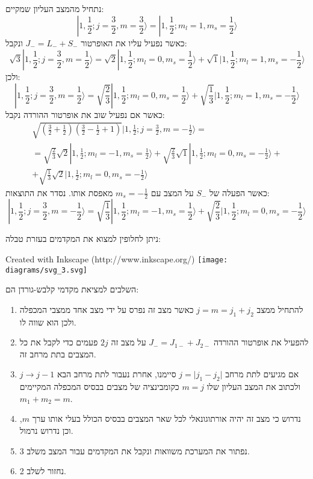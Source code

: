 \documentclass{tstextbook}
\begin{document}
\begin{example}[חיבור תנ"ז \(s=\frac{1}{2}\) עם \(l=1\)]
נתחיל מהמצב העליון שמקיים:
$$|1,{\frac{1}{2}};j={\frac{3}{2}},m={\frac{3}{2}}\rangle=|1,{\frac{1}{2}};m_{l}=1,m_{s}={\frac{1}{2}}\rangle$$
כאשר נפעיל עליו את האופרטור \(J_{-}=L_{-}+S_{-}\) ונקבל:
$$\sqrt{3}|1,\frac{1}{2};j=\frac{3}{2},m=\frac{1}{2}\rangle=\sqrt{2}|1,\frac{1}{2};m_{l}=0,m_{s}=\frac{1}{2}\rangle+\sqrt{1}|1,\frac{1}{2};m_{l}=1,m_{s}=-\frac{1}{2}\rangle$$
ולכן:
$$|1,{\frac{1}{2}};j={\frac{3}{2}},m={\frac{1}{2}}\rangle={\sqrt{\frac{2}{3}}}|1,{\frac{1}{2}};m_{l}=0,m_{s}={\frac{1}{2}}\rangle+{\sqrt{\frac{1}{3}}}|1,{\frac{1}{2}};m_{l}=1,m_{s}=-{\frac{1}{2}}\rangle$$
כאשר אם נפעיל שוב את אופרטור ההורדה נקבל:
\begin{gather*}{\sqrt{\left({\frac{3}{2}}+{\frac{1}{2}}\right)\left({\frac{3}{2}}-{\frac{1}{2}}+1\right)}}|1,{\frac{1}{2}};j={\frac{3}{2}},m=-{\frac{1}{2}}\rangle=\\ =\sqrt{\frac{2}{3}}\sqrt{2}|1,\frac{1}{2};m_{l}=-1,m_{s}=\frac{1}{2}\rangle+\sqrt{\frac{2}{3}}\sqrt{1}|1,\frac{1}{2};m_{l}=0,m_{s}=-\frac{1}{2}\rangle+ \\+\sqrt{\frac{1}{3}}\sqrt{2}|1,\frac{1}{2};m_{l}=0,m_{s}=-\frac{1}{2}\rangle 
\end{gather*}
כאשר הפעלה של \(S_{-}\) על המצב עם \(m_{s}=-\frac{1}{2}\) מאפסת אותו. נסדר את התוצאות:
$$|1,{\frac{1}{2}};j={\frac{3}{2}},m=-{\frac{1}{2}}\rangle={\sqrt{\frac{1}{3}}}|1,{\frac{1}{2}};m_{l}=-1,m_{s}={\frac{1}{2}}\rangle+{\sqrt{\frac{2}{3}}}|1,{\frac{1}{2}};m_{l}=0,m_{s}=-{\frac{1}{2}}\rangle$$

\end{example}
ניתן לחלופין למצוא את המקדמים בעזרת טבלה:

 Created with Inkscape (http://www.inkscape.org/) \texttt{[image: diagrams/svg\_3.svg]}
\begin{summary}
השלבים למציאת מקדמי קלבש-גורדן הם:

  \begin{enumerate}
    \item להתחיל ממצב \(j=m=j_{1}+j_{2}\) כאשר מצב זה נפרס על ידי מצב אחד ממצבי המכפלה ולכן הוא שווה לו. 


    \item להפעיל את אופרטור ההורדה \(J_{-}=J_{1-}+J_{2-}\) על מצב זה \(2j\) פעמים כדי לקבל את כל המצבים בתת מרחב זה. 


    \item אם מגיעים לתת מרחב \(j=\lvert j_{1}-j_{2} \rvert\) סיימנו, אחרת נעבור לתת מרחב הבא \(j\to j-1\) ולכתוב את המצב העליון שלו \(m=j\) כקומבינציה של מצבים בבסיס המכפלה המקיימים \(m_{1}+m_{2}=m\). 


    \item נדרוש כי מצב זה יהיה אורתוגונאלי לכל שאר המצבים בבסיס הכולל בעלי אותו ערך \(m\), וכן נדרוש נרמול. 


    \item נפתור את המערכת משוואות ונקבל את המקדמים עבור המצב משלב 3. 


    \item נחזור לשלב 2. 


  \end{enumerate}
\end{summary}
\end{document}
